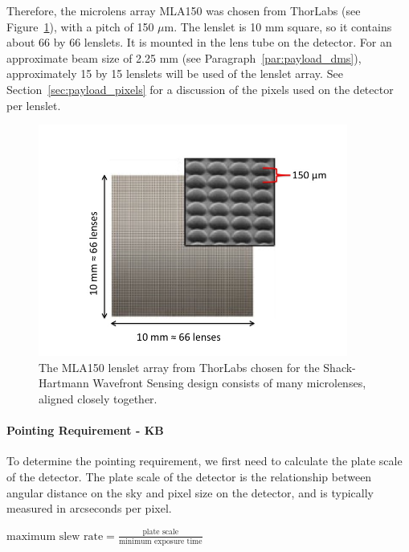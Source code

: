 \documentclass[12pt]{article}
\begin{document}
Therefore, the microlens array MLA150 was chosen from ThorLabs \cite{MLA150} (see Figure~\ref{fig:MLA150}), with a pitch of 150 $\mu$m.
The lenslet is 10 mm square, so it contains about 66 by 66 lenslets. It is mounted in the lens tube on the detector. For an approximate beam size of 2.25 mm (see Paragraph~\ref{par:payload_dms}), approximately 15 by 15 lenslets will be used of the lenslet array.  See Section~\ref{sec:payload_pixels} for a discussion of the pixels used on the detector per lenslet.

\begin{figure}[ht]
\centering
  \includegraphics[width=4in]{images/payload_MLA.jpg}
\caption{The MLA150 lenslet array from ThorLabs \cite{MLA150} chosen for the Shack-Hartmann Wavefront Sensing design consists of many microlenses, aligned closely together.}
\label{fig:MLA150}
\end{figure}

\paragraph{Pointing Requirement - KB}\label{sec:pointing_requirement}

To determine the pointing requirement, we first need to calculate the plate scale of the detector.
The plate scale of the detector is the relationship between angular distance on the sky and pixel size on the detector, and is typically measured in arcseconds per pixel.  

$\text{maximum slew rate} = \frac{\text{plate scale}}{\text{minimum exposure time}}$
\end{document}
